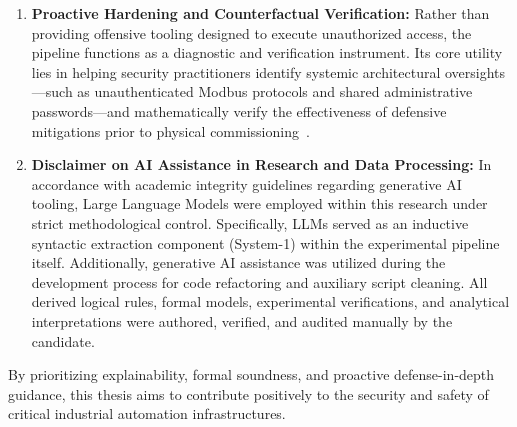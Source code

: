 \documentclass[target=mst,aauheader=aics,style=]{thud}
\begin{document}
\begin{enumerate}
\begin{itemize}
    \item \textbf{Vulnerability Data:} The CVE identifiers (e.g., CVE-2022-25888) and software versions evaluated represent documented public vulnerabilities drawn from the National Vulnerability Database (NVD). They serve as functional test vectors to evaluate attack graph derivation and counterfactual hardening, and do not represent the current vulnerability status or patch level of any operational production line.
\end{itemize}

All accompanying code repositories, declarative rule bases, and experimental scripts include explicit disclaimers restricting their application exclusively to academic research, defensive risk modeling, and authorized network hardening.
    \item \textbf{Proactive Hardening and Counterfactual Verification:} Rather than providing offensive tooling designed to execute unauthorized access, the pipeline functions as a diagnostic and verification instrument. Its core utility lies in helping security practitioners identify systemic architectural oversights---such as unauthenticated Modbus protocols and shared administrative passwords---and mathematically verify the effectiveness of defensive mitigations prior to physical commissioning~\cite{Happe2026}.
    \item \textbf{Disclaimer on AI Assistance in Research and Data Processing:} In accordance with academic integrity guidelines regarding generative AI tooling, Large Language Models were employed within this research under strict methodological control. Specifically, LLMs served as an inductive syntactic extraction component (System-1) within the experimental pipeline itself. Additionally, generative AI assistance was utilized during the development process for code refactoring and auxiliary script cleaning. All derived logical rules, formal models, experimental verifications, and analytical interpretations were authored, verified, and audited manually by the candidate.
\end{enumerate}

By prioritizing explainability, formal soundness, and proactive defense-in-depth guidance, this thesis aims to contribute positively to the security and safety of critical industrial automation infrastructures.

\end{document}
